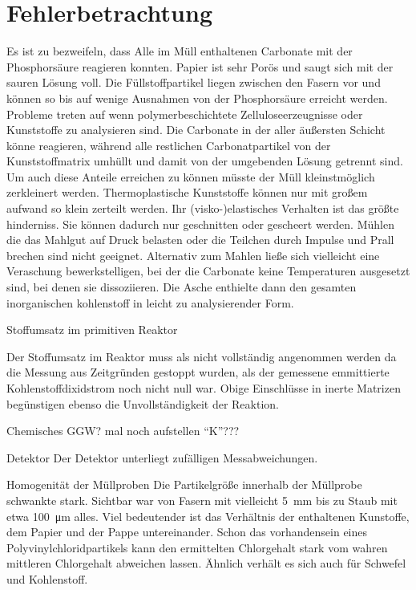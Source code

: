 \chapter{Fehlerbetrachtung}

Es ist zu bezweifeln, dass Alle im Müll enthaltenen Carbonate mit der Phosphorsäure reagieren konnten. Papier ist sehr Porös und saugt sich mit der sauren Lösung voll. Die Füllstoffpartikel liegen zwischen den Fasern vor und können so bis auf wenige Ausnahmen von der Phosphorsäure erreicht werden. Probleme treten auf wenn polymerbeschichtete Zelluloseerzeugnisse oder Kunststoffe zu analysieren sind. Die Carbonate in der aller äußersten Schicht könne reagieren, während alle restlichen Carbonatpartikel von der Kunststoffmatrix umhüllt und damit von der umgebenden Lösung getrennt sind. Um auch diese Anteile erreichen zu können müsste der Müll kleinstmöglich zerkleinert werden. Thermoplastische Kunststoffe können nur mit großem aufwand so klein zerteilt werden. Ihr (visko-)elastisches Verhalten ist das größte hinderniss. Sie können dadurch nur geschnitten oder gescheert werden. Mühlen die das Mahlgut auf Druck belasten oder die Teilchen durch Impulse und Prall brechen sind nicht geeignet.
Alternativ zum Mahlen ließe sich vielleicht eine Veraschung bewerkstelligen, bei der die Carbonate keine Temperaturen ausgesetzt sind, bei denen sie dissoziieren. Die Asche enthielte dann den gesamten inorganischen kohlenstoff in leicht zu analysierender Form.

Stoffumsatz im primitiven Reaktor

Der Stoffumsatz im Reaktor muss als nicht vollständig angenommen werden da die Messung aus Zeitgründen gestoppt wurden, als der gemessene emmittierte Kohlenstoffdixidstrom noch nicht null war. Obige Einschlüsse in inerte Matrizen begünstigen ebenso die Unvollständigkeit der Reaktion. 


Chemisches GGW? mal noch aufstellen "`K"'???

Detektor
Der Detektor unterliegt zufälligen Messabweichungen. 

Homogenität der Müllproben
Die Partikelgröße innerhalb der Müllprobe schwankte stark. Sichtbar war von Fasern mit vielleicht \SI{5}{\milli\meter} bis zu Staub mit etwa \SI{100}{\micro\meter} alles. Viel bedeutender ist das Verhältnis der enthaltenen Kunstoffe, dem Papier und der Pappe untereinander. Schon das vorhandensein eines Polyvinylchloridpartikels kann den ermittelten Chlorgehalt stark vom wahren mittleren Chlorgehalt abweichen lassen.
Ähnlich verhält es sich auch für Schwefel und Kohlenstoff.


